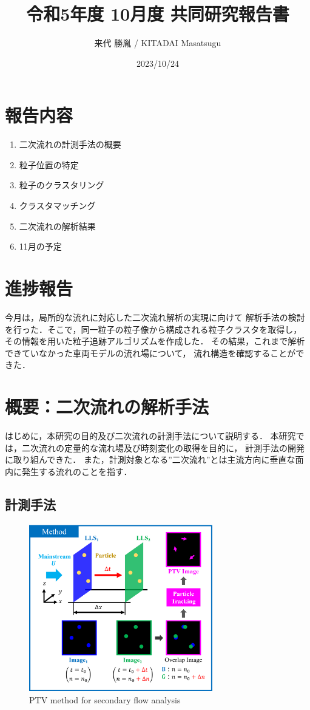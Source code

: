 \documentclass[twocolumn,a4j]{jsarticle}
\author{来代 勝胤 / KITADAI Masatsugu}
\title{令和5年度 10月度 共同研究報告書}
\date{2023/10/24}
\begin{document}
\columnseprule=0.1mm
\maketitle

\section*{報告内容}
\begin{enumerate}[1.]
	\item 二次流れの計測手法の概要
	\item 粒子位置の特定
	\item 粒子のクラスタリング
	\item クラスタマッチング
	\item 二次流れの解析結果
	\item 11月の予定
\end{enumerate}

\section*{進捗報告}
今月は，局所的な流れに対応した二次流れ解析の実現に向けて
解析手法の検討を行った．そこで，同一粒子の粒子像から構成される粒子クラスタを取得し，
その情報を用いた粒子追跡アルゴリズムを作成した．
その結果，これまで解析できていなかった車両モデルの流れ場について，
流れ構造を確認することができた．

\section{概要：二次流れの解析手法}
はじめに，本研究の目的及び二次流れの計測手法について説明する．
本研究では，二次流れの定量的な流れ場及び時刻変化の取得を目的に，
計測手法の開発に取り組んできた．
また，計測対象となる”二次流れ”とは主流方向に垂直な面内に発生する流れのことを指す．

\subsection{計測手法}
\begin{figure}[htbp]
	\centering
	\includegraphics[keepaspectratio, width=80mm]{../images/method.png}
	\caption{PTV method for secondary flow analysis}
\end{figure}
\end{document}
